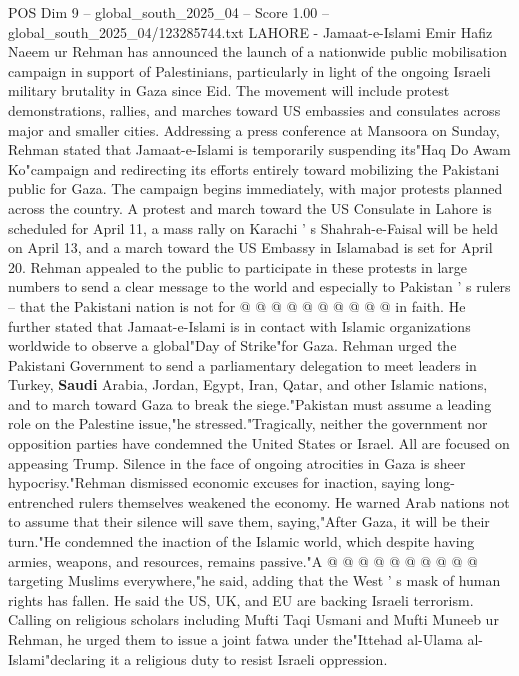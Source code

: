 \begin{textsample}{POS Dim 9 – global\_south\_2025\_04 – Score 1.00 – global\_south\_2025\_04/123285744.txt}  \label{ex:f9_pos_146}
LAHORE - Jamaat-e-Islami Emir Hafiz Naeem ur Rehman has announced the launch of a nationwide public mobilisation campaign in support of Palestinians, particularly in light of the ongoing Israeli military brutality in Gaza since Eid.
The movement will include protest demonstrations, rallies, and marches toward US embassies and consulates across major and smaller cities.
Addressing a press conference at Mansoora on Sunday, Rehman stated that Jamaat-e-Islami is temporarily suspending its"Haq Do Awam Ko"campaign and redirecting its efforts entirely toward mobilizing the Pakistani public for Gaza.
The campaign begins immediately, with major protests planned across the country.
A protest and march toward the US Consulate in Lahore is scheduled for April 11, a mass rally on Karachi ' s Shahrah-e-Faisal will be held on April 13, and a march toward the US Embassy in Islamabad is set for April 20.
Rehman appealed to the public to participate in these protests in large numbers to send a clear message to the world and especially to Pakistan ' s rulers -- that the Pakistani nation is not for @ @ @ @ @ @ @ @ @ @ in faith.
He further stated that Jamaat-e-Islami is in contact with Islamic organizations worldwide to observe a global"Day of Strike"for Gaza.
Rehman urged the Pakistani Government to send a parliamentary delegation to meet leaders in Turkey, \textbf{Saudi} Arabia, Jordan, Egypt, Iran, Qatar, and other Islamic nations, and to march toward Gaza to break the siege."Pakistan must assume a leading role on the Palestine issue,"he stressed."Tragically, neither the government nor opposition parties have condemned the United States or Israel.
All are focused on appeasing Trump.
Silence in the face of ongoing atrocities in Gaza is sheer hypocrisy."Rehman dismissed economic excuses for inaction, saying long-entrenched rulers themselves weakened the economy.
He warned Arab nations not to assume that their silence will save them, saying,"After Gaza, it will be their turn."He condemned the inaction of the Islamic world, which despite having armies, weapons, and resources, remains passive."A @ @ @ @ @ @ @ @ @ @ targeting Muslims everywhere,"he said, adding that the West ' s mask of human rights has fallen.
He said the US, UK, and EU are backing Israeli terrorism.
Calling on religious scholars including Mufti Taqi Usmani and Mufti Muneeb ur Rehman, he urged them to issue a joint fatwa under the"Ittehad al-Ulama al-Islami"declaring it a religious duty to resist Israeli oppression.

\end{textsample}
